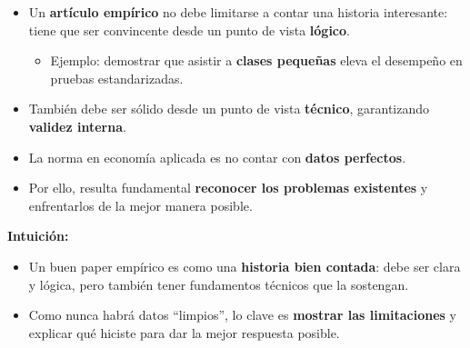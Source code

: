 \documentclass[12pt]{article}
\begin{document}
\begin{itemize}
    \item Un \textbf{artículo empírico} no debe limitarse a contar una historia interesante: tiene que ser convincente desde un punto de vista \textbf{lógico}.  
    \begin{itemize}
        \item Ejemplo: demostrar que asistir a \textbf{clases pequeñas} eleva el desempeño en pruebas estandarizadas.
    \end{itemize}
    \item También debe ser sólido desde un punto de vista \textbf{técnico}, garantizando \textbf{validez interna}.
    \item La norma en economía aplicada es no contar con \textbf{datos perfectos}.
    \item Por ello, resulta fundamental \textbf{reconocer los problemas existentes} y enfrentarlos de la mejor manera posible.
\end{itemize}

\textbf{Intuición:}
\begin{itemize}
    \item Un buen paper empírico es como una \textbf{historia bien contada}: debe ser clara y lógica, pero también tener fundamentos técnicos que la sostengan.
    \item Como nunca habrá datos “limpios”, lo clave es \textbf{mostrar las limitaciones} y explicar qué hiciste para dar la mejor respuesta posible.
\end{itemize}
\end{document}
